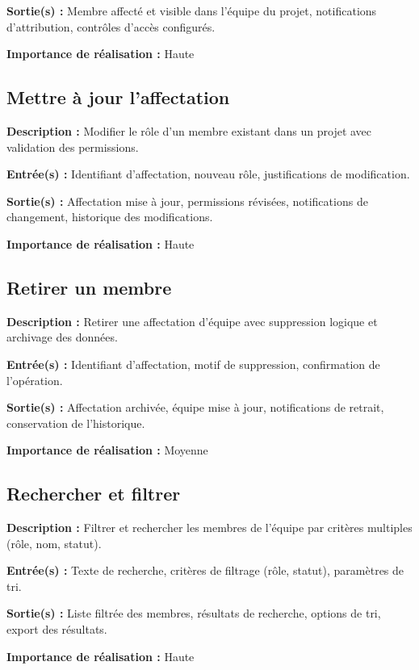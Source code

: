 \textbf{Sortie(s) :} Membre affecté et visible dans l'équipe du projet, notifications d'attribution, contrôles d'accès configurés.

\textbf{Importance de réalisation :} Haute

\subsection{Mettre à jour l'affectation}
\textbf{Description :} Modifier le rôle d'un membre existant dans un projet avec validation des permissions.

\textbf{Entrée(s) :} Identifiant d'affectation, nouveau rôle, justifications de modification.

\textbf{Sortie(s) :} Affectation mise à jour, permissions révisées, notifications de changement, historique des modifications.

\textbf{Importance de réalisation :} Haute

\subsection{Retirer un membre}
\textbf{Description :} Retirer une affectation d'équipe avec suppression logique et archivage des données.

\textbf{Entrée(s) :} Identifiant d'affectation, motif de suppression, confirmation de l'opération.

\textbf{Sortie(s) :} Affectation archivée, équipe mise à jour, notifications de retrait, conservation de l'historique.

\textbf{Importance de réalisation :} Moyenne

\subsection{Rechercher et filtrer}
\textbf{Description :} Filtrer et rechercher les membres de l'équipe par critères multiples (rôle, nom, statut).

\textbf{Entrée(s) :} Texte de recherche, critères de filtrage (rôle, statut), paramètres de tri.

\textbf{Sortie(s) :} Liste filtrée des membres, résultats de recherche, options de tri, export des résultats.

\textbf{Importance de réalisation :} Haute
    
